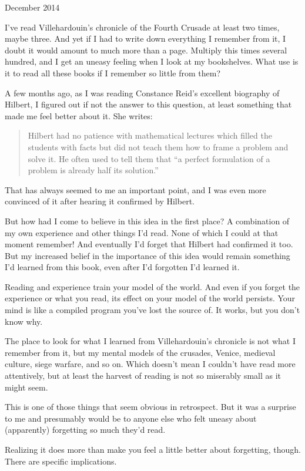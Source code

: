 December 2014

I've read Villehardouin's chronicle of the Fourth Crusade at least two
times, maybe three. And yet if I had to write down everything I remember
from it, I doubt it would amount to much more than a page. Multiply this
times several hundred, and I get an uneasy feeling when I look at my
bookshelves. What use is it to read all these books if I remember so
little from them?

A few months ago, as I was reading Constance Reid's excellent biography
of Hilbert, I figured out if not the answer to this question, at least
something that made me feel better about it. She writes:

\begin{quote}
Hilbert had no patience with mathematical lectures which filled the
students with facts but did not teach them how to frame a problem and
solve it. He often used to tell them that ``a perfect formulation of a
problem is already half its solution.''
\end{quote}

That has always seemed to me an important point, and I was even more
convinced of it after hearing it confirmed by Hilbert.

But how had I come to believe in this idea in the first place? A
combination of my own experience and other things I'd read. None of
which I could at that moment remember! And eventually I'd forget that
Hilbert had confirmed it too. But my increased belief in the importance
of this idea would remain something I'd learned from this book, even
after I'd forgotten I'd learned it.

Reading and experience train your model of the world. And even if you
forget the experience or what you read, its effect on your model of the
world persists. Your mind is like a compiled program you've lost the
source of. It works, but you don't know why.

The place to look for what I learned from Villehardouin's chronicle is
not what I remember from it, but my mental models of the crusades,
Venice, medieval culture, siege warfare, and so on. Which doesn't mean I
couldn't have read more attentively, but at least the harvest of reading
is not so miserably small as it might seem.

This is one of those things that seem obvious in retrospect. But it was
a surprise to me and presumably would be to anyone else who felt uneasy
about (apparently) forgetting so much they'd read.

Realizing it does more than make you feel a little better about
forgetting, though. There are specific implications.

